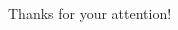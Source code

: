 \documentclass{beamer}
\begin{document}
\begin{CJK}{UTF8}{bsmi}
\begin{frame}
  \begin{center}
    \huge Thanks for your attention!
  \end{center}
\end{frame}

\end{CJK}
\end{document}
